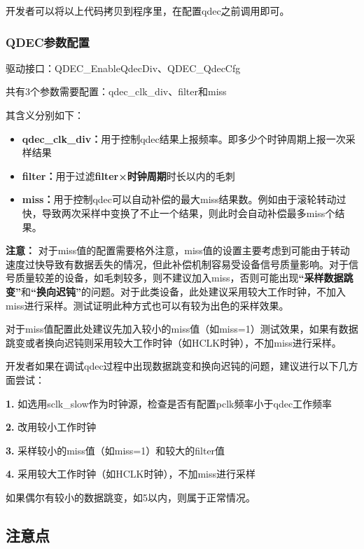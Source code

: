 \documentclass[
  12pt,
]{book}
\begin{document}
开发者可以将以上代码拷贝到程序里，在配置qdec之前调用即可。

\hypertarget{qdecux53c2ux6570ux914dux7f6e}{%
\subsubsection{QDEC参数配置}\label{qdecux53c2ux6570ux914dux7f6e}}

驱动接口：QDEC\_EnableQdecDiv、QDEC\_QdecCfg

共有3个参数需要配置：qdec\_clk\_div、filter和miss

其含义分别如下：

\begin{itemize}
\item
  \textbf{qdec\_clk\_div：}用于控制qdec结果上报频率。即多少个时钟周期上报一次采样结果
\item
  \textbf{filter：}用于过滤\textbf{filter×时钟周期}时长以内的毛刺
\item
  \textbf{miss：}用于控制qdec可以自动补偿的最大miss结果数。例如由于滚轮转动过快，导致两次采样中变换了不止一个结果，则此时会自动补偿最多miss个结果。
\end{itemize}

\textbf{注意：} 对于miss值的配置需要格外注意，miss值的设置主要考虑到可能由于转动速度过快导致有数据丢失的情况，但此补偿机制容易受设备信号质量影响。对于信号质量较差的设备，如毛刺较多，则不建议加入miss，否则可能出现\textbf{``采样数据跳变''}和\textbf{``换向迟钝''}的问题。对于此类设备，此处建议采用较大工作时钟，不加入miss进行采样。测试证明此种方式也可以有较为出色的采样效果。

对于miss值配置此处建议先加入较小的miss值（如miss=1）测试效果，如果有数据跳变或者换向迟钝则采用较大工作时钟（如HCLK时钟），不加miss进行采样。

开发者如果在调试qdec过程中出现数据跳变和换向迟钝的问题，建议进行以下几方面尝试：

\textbf{1.} 如选用sclk\_slow作为时钟源，检查是否有配置pclk频率小于qdec工作频率

\textbf{2.} 改用较小工作时钟

\textbf{3.} 采样较小的miss值（如miss=1）和较大的filter值

\textbf{4.} 采用较大工作时钟（如HCLK时钟），不加miss进行采样

如果偶尔有较小的数据跳变，如5以内，则属于正常情况。

\hypertarget{ux6ce8ux610fux70b9-5}{%
\subsection{注意点}\label{ux6ce8ux610fux70b9-5}}
\end{document}
